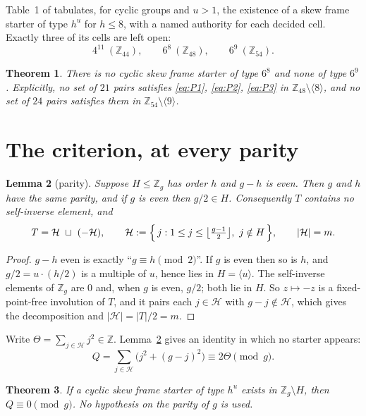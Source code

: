 \documentclass[11pt]{amsart}
\newtheorem{theorem}{Theorem}
\newtheorem{lemma}[theorem]{Lemma}
\theoremstyle{remark}
\begin{document}
Table~1 of \cite{Stinson23} tabulates, for cyclic groups and $u>1$, the
existence of a skew frame starter of type $h^{u}$ for $h\le 8$, with a named
authority for each decided cell. Exactly three of its cells are left open:
\[
  4^{11}\ (\mathbb Z_{44}),\qquad
  6^{8}\ (\mathbb Z_{48}),\qquad
  6^{9}\ (\mathbb Z_{54}).
\]

\begin{theorem}\label{thm:main}
There is no cyclic skew frame starter of type $6^{8}$ and none of type
$6^{9}$. Explicitly, no set of $21$ pairs satisfies \eqref{eq:P1},
\eqref{eq:P2}, \eqref{eq:P3} in
$\mathbb Z_{48}\setminus\langle 8\rangle$, and no set of $24$ pairs satisfies
them in $\mathbb Z_{54}\setminus\langle 9\rangle$.
\end{theorem}

\section{The criterion, at every parity}

\begin{lemma}[parity]\label{lem:parity}
Suppose $H\le\mathbb Z_g$ has order $h$ and $g-h$ is even. Then $g$ and $h$
have the same parity, and if $g$ is even then $g/2\in H$. Consequently $T$
contains no self-inverse element, and
\[
  T=\mathcal H\ \sqcup\ (-\mathcal H),
  \qquad
  \mathcal H:=\Bigl\{\,j : 1\le j\le\bigl\lfloor\tfrac{g-1}{2}\bigr\rfloor,\
                       j\notin H\,\Bigr\},
  \qquad |\mathcal H|=m .
\]
\end{lemma}

\begin{proof}
$g-h$ even is exactly ``$g\equiv h\pmod 2$''. If $g$ is even then so is $h$,
and $g/2=u\cdot(h/2)$ is a multiple of $u$, hence lies in $H=\langle
u\rangle$. The self-inverse elements of $\mathbb Z_g$ are $0$ and, when $g$ is
even, $g/2$; both lie in $H$. So $z\mapsto-z$ is a fixed-point-free involution
of $T$, and it pairs each $j\in\mathcal H$ with $g-j\notin\mathcal H$, which
gives the decomposition and $|\mathcal H|=|T|/2=m$.
\end{proof}

Write $\Theta=\sum_{j\in\mathcal H}j^{2}\in\mathbb Z$. Lemma~\ref{lem:parity}
gives an identity in which no starter appears:
\begin{equation}\label{eq:QT}
  Q=\sum_{j\in\mathcal H}\bigl(j^{2}+(g-j)^{2}\bigr)\equiv 2\Theta \pmod g .
\end{equation}

\begin{theorem}\label{thm:crit}
If a cyclic skew frame starter of type $h^{u}$ exists in
$\mathbb Z_g\setminus H$, then $Q\equiv0\pmod g$. No hypothesis on the parity
of $g$ is used.
\end{theorem}
\end{document}
